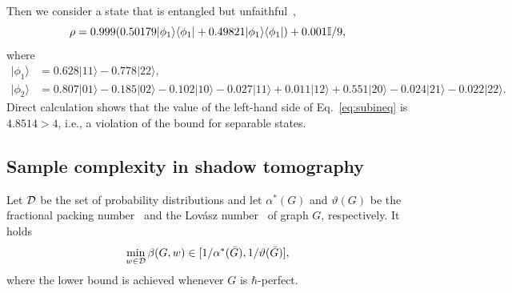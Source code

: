 Then we consider a state that is entangled but unfaithful~\cite{Weilenmann2019EntanglementDB},
\begin{equation}
	\rho = 0.999 (0.50179 |\phi_1\rangle\langle \phi_1| + 0.49821|\phi_1\rangle\langle \phi_1|) + 0.001 \mathbb{I}/9,
\end{equation}
where
\begin{align}
	|\phi_1\rangle &= 0.628|11\rangle - 0.778 |22\rangle,\nonumber\\
	|\phi_2\rangle &= 0.807|01\rangle - 0.185|02\rangle  - 0.102 |10\rangle - 0.027|11\rangle + 0.011|12\rangle + 0.551|20\rangle - 0.024|21\rangle - 0.022|22\rangle.
\end{align}
Direct calculation shows that the value of the left-hand side of Eq.~\eqref{eq:subineq} is $4.8514 > 4$, i.e., a violation of the bound for separable states.
\subsection{Sample complexity in shadow tomography}\label{ssec:tomography}
\begin{theorem}
  Let ${\cal D}$ be the set of probability distributions and let $\alpha^*(G)$ and $\vartheta(G)$ be the fractional packing number~\cite{schrijver1979fractional} and the Lov\'{a}sz number~\cite{lovasz1979shannon} of graph $G$, respectively. It holds
  \begin{equation}
    \min_{w\in {\cal D}} \beta(G,w) \in [1/\alpha^*(\bar{G}), 1/\vartheta(\bar{G})],
  \end{equation}
where the lower bound is achieved whenever $G$ is $\hbar$-perfect.
\end{theorem}
